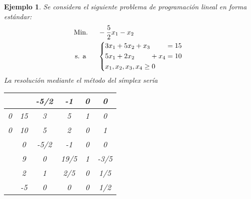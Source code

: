 \documentclass[11pt]{report}
\theoremstyle{mytheorem}
\theoremstyle{mydefinition}
\theoremstyle{myexample}
\newtheorem*{example}{Ejemplo}
\begin{document}
\begin{example}
Se considera el siguiente problema de programación lineal en forma estándar:
\[\begin{aligned}[t]
&\text{Min. } && -\frac{5}{2}x_1-x_2 \\
& \, \text{s. a} &&\left\{\begin{alignedat}{10}
& 3x_1 & {}+{} & 5x_2 & {}+{} & x_3 &       &     & {}={} 15 \\
& 5x_1 & {}+{} & 2x_2 &       &     & {}+{} & x_4 & {}={}10 \\
& \mathrlap{x_1, x_2,x_3,x_4 \geq 0} \\
\end{alignedat}\right.
\end{aligned}\]
La resolución mediante el método del símplex sería
\begin{center}
\begin{tabular}{|c|c|c|c|c|c|}
    \cline{3-6}
    \multicolumn{1}{c}{} & \multicolumn{1}{c|}{} & \multicolumn{1}{c}{-5/2} & \multicolumn{1}{c}{-1} & \multicolumn{1}{c}{\phantom{-}0} & \multicolumn{1}{c|}{\phantom{-}0} \\ \hline
    0 & \phantom{-}15 & \multicolumn{1}{c}{\phantom{-}3} & \multicolumn{1}{c}{\phantom{-}5} & \multicolumn{1}{c}{\phantom{-}1} & \multicolumn{1}{c|}{\phantom{-}0} \\
    0 & \phantom{-}10 & \multicolumn{1}{c}{\phantom{-}5} & \multicolumn{1}{c}{\phantom{-}2} & \multicolumn{1}{c}{\phantom{-}0} & \multicolumn{1}{c|}{\phantom{-}1} \\ \hline
    \multicolumn{1}{c|}{} & \phantom{-}0 & \multicolumn{1}{c}{-5/2} & \multicolumn{1}{c}{-1} & \multicolumn{1}{c}{\phantom{-}0} & \multicolumn{1}{c|}{\phantom{-}0}\\ \hhline{~|=|=|=|=|=|}
    \multicolumn{1}{c|}{} & \phantom{-}9 & \multicolumn{1}{c}{\phantom{-}0} & \multicolumn{1}{c}{\phantom{-}19/5} & \multicolumn{1}{c}{\phantom{-}1} & \multicolumn{1}{c|}{-3/5} \\
    \multicolumn{1}{c|}{} & \phantom{-}2 & \multicolumn{1}{c}{\phantom{-}1} & \multicolumn{1}{c}{\phantom{-}2/5} & \multicolumn{1}{c}{\phantom{-}0} & \multicolumn{1}{c|}{\phantom{-}1/5} \\ \cline{2-6}
    \multicolumn{1}{c|}{} & -5 & \multicolumn{1}{c}{\phantom{-}0} & \multicolumn{1}{c}{\phantom{-}0} & \multicolumn{1}{c}{\phantom{-}0} & \multicolumn{1}{c|}{\phantom{-}1/2} \\ \cline{2-6}
\end{tabular}
\end{center}

\end{example}
\end{document}
